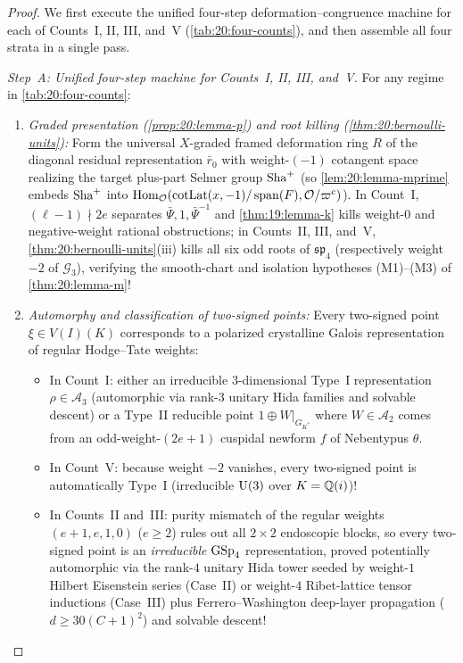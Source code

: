 \begin{proof}
We first execute the unified four-step deformation--congruence machine for each of Counts~I, II, III, and~V (\cref{tab:20:four-counts}), and then assemble all four strata in a single pass.

\emph{Step~A: Unified four-step machine for Counts~I, II, III, and~V.}
For any regime in \cref{tab:20:four-counts}:
\begin{enumerate}[label=\textup{\arabic*.}]
\item \emph{Graded presentation (\cref{prop:20:lemma-p}) and root killing (\cref{thm:20:bernoulli-units}):} Form the universal $X$-graded framed deformation ring $R$ of the diagonal residual representation $\bar{r}_0$ with weight-$(-1)$ cotangent space realizing the target plus-part Selmer group $\mathrm{Sha}^+$ (so \cref{lem:20:lemma-mprime} embeds $\mathrm{Sha}^+$ into $\mathrm{Hom}_{\mathcal{O}}(\operatorname{cotLat}(x, -1)/\operatorname{span}(F), \mathcal{O}/\varpi^c)$). In Count~I, $(\ell - 1) \nmid 2e$ separates $\bar{\Psi}, 1, \bar{\Psi}^{-1}$ and \cref{thm:19:lemma-k} kills weight-$0$ and negative-weight rational obstructions; in Counts~II, III, and~V, \cref{thm:20:bernoulli-units}(iii) kills all six odd roots of $\mathfrak{sp}_4$ (respectively weight $-2$ of $\mathcal{G}_3$), verifying the smooth-chart and isolation hypotheses (M1)--(M3) of \cref{thm:20:lemma-m}!
\item \emph{Automorphy and classification of two-signed points:} Every two-signed point $\xi \in V(I)(K)$ corresponds to a polarized crystalline Galois representation of regular Hodge--Tate weights:
  \begin{itemize}
  \item In Count~I: either an irreducible $3$-dimensional Type~I representation $\rho \in \mathcal{A}_3$ (automorphic via rank-$3$ unitary Hida families and solvable descent) or a Type~II reducible point $1 \oplus W|_{G_{K^*}}$ where $W \in \mathcal{A}_2$ comes from an odd-weight-$(2e+1)$ cuspidal newform $f$ of Nebentypus $\theta$.
  \item In Count~V: because weight $-2$ vanishes, every two-signed point is automatically Type~I (irreducible $\mathrm{U}(3)$ over $K = \mathbb{Q}(i)$)!
  \item In Counts~II and~III: purity mismatch of the regular weights $(e+1, e, 1, 0)$ ($e \ge 2$) rules out all $2 \times 2$ endoscopic blocks, so every two-signed point is an \emph{irreducible} $\mathrm{GSp}_4$ representation, proved potentially automorphic via the rank-$4$ unitary Hida tower seeded by weight-$1$ Hilbert Eisenstein series (Case~II) or weight-$4$ Ribet-lattice tensor inductions (Case~III) plus Ferrero--Washington deep-layer propagation ($d \ge 30(C+1)^2$) and solvable descent!

\end{itemize}
\end{enumerate}
\end{proof}

